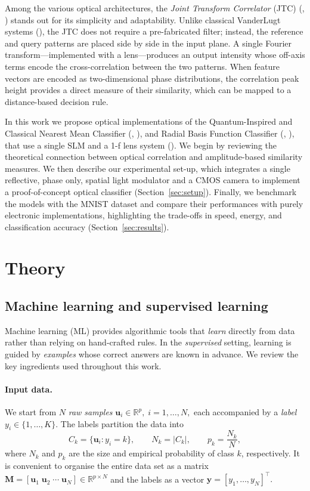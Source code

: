 \documentclass[twocolumn]{article} %
\begin{document}
Among the various optical architectures, the \emph{Joint Transform Correlator} (JTC) (\cite{Psaltis1984}, \cite{Dragulinescu2023}) stands out for its simplicity and adaptability.  Unlike classical VanderLugt systems (\cite{VanderLugt1964}), the JTC does not require a pre-fabricated filter; instead, the reference and query patterns are placed side by side in the input plane.  A single Fourier transform—implemented with a lens—produces an output intensity whose off-axis terms encode the cross-correlation between the two patterns.  
When feature vectors are encoded as two-dimensional phase distributions, the correlation peak height provides a direct measure of their similarity, which can be mapped to a distance-based decision rule.

In this work we propose optical implementations of the Quantum-Inspired and Classical Nearest Mean Classifier (\cite{Cruzeiro2024}, \cite{Sergioli2025}), and Radial Basis Function Classifier (\cite{Neifeld1993}, \cite{Foor1995}), that use a single SLM and a 1-f lens system (\cite{Javidi1989}).  We begin by reviewing the theoretical connection between optical correlation and amplitude-based similarity measures. We then describe our experimental set-up, which integrates a single reflective, phase only, spatial light modulator and a CMOS camera to implement a proof-of-concept optical classifier (Section~\ref{sec:setup}).  Finally, we benchmark the models with the MNIST dataset and compare their performances with purely electronic implementations, highlighting the trade-offs in speed, energy, and classification accuracy (Section~\ref{sec:results}).


\section{Theory}

\subsection{Machine learning and supervised learning}

\label{subsec:ml}

Machine learning (ML) provides algorithmic tools that \emph{learn}
directly from data rather than relying on hand-crafted rules.
In the \emph{supervised} setting, learning is guided by \emph{examples}
whose correct answers are known in advance.  We review the key
ingredients used throughout this work.

\paragraph{Input data.}
We start from $N$ \emph{raw samples}
\(
\mathbf u_i\in\mathbb R^{p},\; i=1,\dots,N,
\)
each accompanied by a \emph{label}
\(
y_i\in\{1,\dots,K\}.
\)
The labels partition the data into
\[
C_k=\{\mathbf u_i: y_i=k\},
\qquad
N_k=|C_k|,
\qquad
p_k=\frac{N_k}{N},
\]
where $N_k$ and $p_k$ are the size and empirical probability of class
$k$, respectively.  It is convenient to organise the entire data set as
a matrix
$
\mathbf M=[\mathbf u_1\;\mathbf u_2\;\cdots\;\mathbf u_N]\in\mathbb R^{p\times N}
$
and the labels as a vector
$
\mathbf y=[y_1,\dots,y_N]^{\!\top}\!.
$
\end{document}
